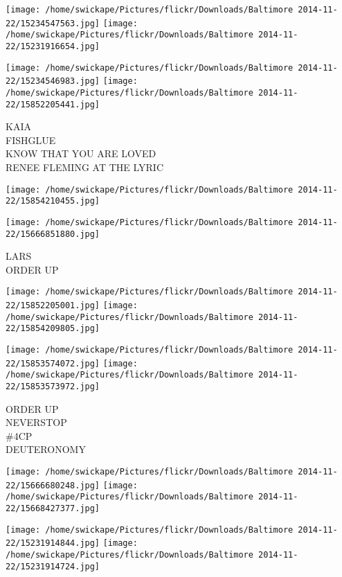 \documentclass[10pt,letterpaper]{article}
\begin{document}
\texttt{[image: /home/swickape/Pictures/flickr/Downloads/Baltimore 2014-11-22/15234547563.jpg]}
\texttt{[image: /home/swickape/Pictures/flickr/Downloads/Baltimore 2014-11-22/15231916654.jpg]}

\texttt{[image: /home/swickape/Pictures/flickr/Downloads/Baltimore 2014-11-22/15234546983.jpg]}
\texttt{[image: /home/swickape/Pictures/flickr/Downloads/Baltimore 2014-11-22/15852205441.jpg]}

KAIA\\
FISHGLUE\\
KNOW THAT YOU ARE LOVED\\
RENEE FLEMING AT THE LYRIC\\
\pagebreak

\texttt{[image: /home/swickape/Pictures/flickr/Downloads/Baltimore 2014-11-22/15854210455.jpg]}

\vspace{0.25in}
\texttt{[image: /home/swickape/Pictures/flickr/Downloads/Baltimore 2014-11-22/15666851880.jpg]}

LARS\\
ORDER UP\\
\pagebreak

\texttt{[image: /home/swickape/Pictures/flickr/Downloads/Baltimore 2014-11-22/15852205001.jpg]}
\texttt{[image: /home/swickape/Pictures/flickr/Downloads/Baltimore 2014-11-22/15854209805.jpg]}

\texttt{[image: /home/swickape/Pictures/flickr/Downloads/Baltimore 2014-11-22/15853574072.jpg]}
\texttt{[image: /home/swickape/Pictures/flickr/Downloads/Baltimore 2014-11-22/15853573972.jpg]}

ORDER UP\\
NEVERSTOP\\
\#4CP\\
DEUTERONOMY\\
\pagebreak

\texttt{[image: /home/swickape/Pictures/flickr/Downloads/Baltimore 2014-11-22/15666680248.jpg]}
\texttt{[image: /home/swickape/Pictures/flickr/Downloads/Baltimore 2014-11-22/15668427377.jpg]}

\texttt{[image: /home/swickape/Pictures/flickr/Downloads/Baltimore 2014-11-22/15231914844.jpg]}
\texttt{[image: /home/swickape/Pictures/flickr/Downloads/Baltimore 2014-11-22/15231914724.jpg]}
\end{document}
